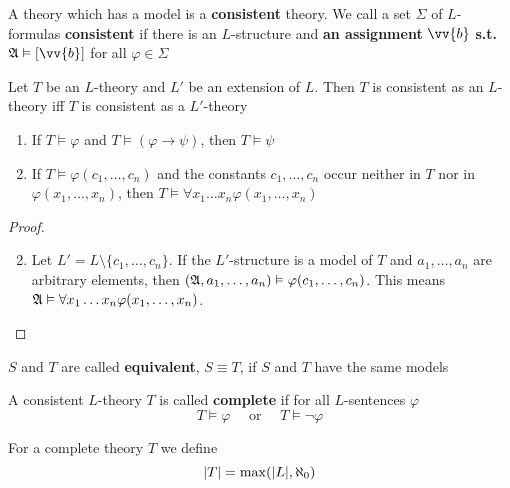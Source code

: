 \documentclass[11pt]{article}
\begin{document}
A theory which has a model is a \textbf{consistent} theory. We call a set \(\Sigma\) of
\(L\)-formulas \textbf{consistent} if there is an \(L\)-structure and \textbf{an assignment}
\(\vv{b}\) \textbf{s.t.} \(\fA\vDash[\vv{b}]\) for all \(\varphi\in\Sigma\)

\begin{lemma}[]
Let \(T\) be an \(L\)-theory and \(L'\) be an extension of \(L\). Then \(T\)
is consistent as an \(L\)-theory iff \(T\) is consistent as a \(L'\)-theory
\end{lemma}


\begin{lemma}[]
\label{lemma1.3.4}
\begin{enumerate}
\item If \(T\vDash\varphi\) and \(T\vDash(\varphi\to\psi)\), then \(T\vDash\psi\)
\item If \(T\vDash\varphi(c_1,\dots,c_n)\) and the constants \(c_1,\dots,c_n\)
occur neither in \(T\) nor in \(\varphi(x_1,\dots,x_n)\), then
\(T\vDash\forall x_1\dots x_n\varphi(x_1,\dots,x_n)\)
\end{enumerate}
\end{lemma}

\begin{proof}
\begin{enumerate}
\setcounter{enumi}{1}
\item Let \(L'=L\setminus\{c_1,\dots,c_n\}\). If the \(L'\)-structure is a
model of \(T\) and \(a_1,\dots,a_n\) are arbitrary elements, then
\((\mathfrak{A},a_1,\dots,a_n)\vDash\varphi(c_1,\dots,c_n)\). This means
\(\mathfrak{A}\vDash\forall x_1\dots x_n\varphi(x_1,\dots,x_n)\).
\end{enumerate}
\end{proof}

\(S\) and \(T\) are called \textbf{equivalent}, \(S\equiv T\), if \(S\) and \(T\) have
the same models

\begin{definition}[]
A consistent \(L\)-theory \(T\) is called \textbf{complete} if for all \(L\)-sentences
\(\varphi\)
\begin{equation*}
T\vDash\varphi \quad\text{ or }\quad T\vDash\neg\varphi
\end{equation*}
\end{definition}

\begin{definition}[]
For a complete theory \(T\) we define
\begin{equation*}
\abs{T}=\max(\abs{L},\aleph_0)
\end{equation*}
\end{definition}
\end{document}
